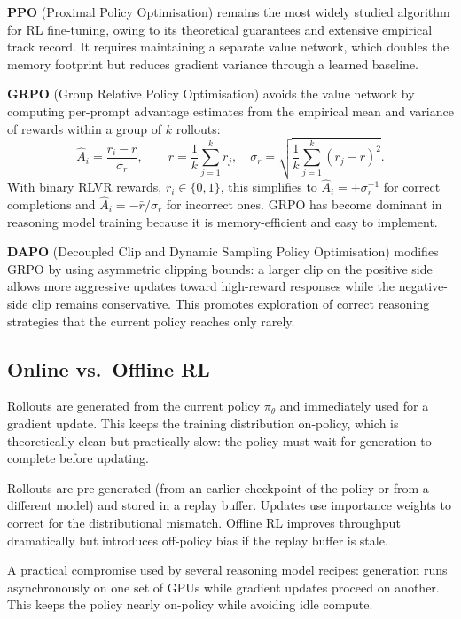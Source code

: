 \textbf{PPO} (Proximal Policy Optimisation)
remains the most widely studied algorithm for RL fine-tuning, owing
to its theoretical guarantees and extensive empirical track record.
It requires maintaining a separate value network, which doubles the
memory footprint but reduces gradient variance through a learned baseline.

\textbf{GRPO} (Group Relative Policy Optimisation) avoids
the value network by computing per-prompt advantage estimates from
the empirical mean and variance of rewards within a group of $k$
rollouts:
\begin{equation}
\label{eq:grpo-advantage-ch15}
\hat{A}_i = \frac{r_i - \bar{r}}{\sigma_r}, \qquad
\bar{r} = \frac{1}{k}\sum_{j=1}^k r_j, \quad
\sigma_r = \sqrt{\frac{1}{k}\sum_{j=1}^k (r_j - \bar{r})^2}.
\end{equation}
With binary RLVR rewards, $r_i \in \{0, 1\}$, this simplifies to
$\hat{A}_i = +\sigma_r^{-1}$ for correct completions and
$\hat{A}_i = -\bar{r}/\sigma_r$ for incorrect ones. GRPO has become
dominant in reasoning model training because it is memory-efficient
and easy to implement.

\textbf{DAPO} (Decoupled Clip and Dynamic Sampling Policy
Optimisation) modifies GRPO by using asymmetric clipping bounds: a
larger clip on the positive side allows more aggressive updates toward
high-reward responses while the negative-side clip remains conservative.
This promotes exploration of correct reasoning strategies that the
current policy reaches only rarely.

\subsection{Online vs.\ Offline RL}
\label{subsec:online-offline}

\begin{description}[leftmargin=!,labelwidth=3.5cm]
\item[Online RL] Rollouts are generated from the current policy
  $\pi_\theta$ and immediately used for a gradient update. This keeps
  the training distribution on-policy, which is theoretically clean
  but practically slow: the policy must wait for generation to complete
  before updating.

\item[Offline RL] Rollouts are pre-generated (from an earlier
  checkpoint of the policy or from a different model) and stored in a
  replay buffer. Updates use importance weights to correct for the
  distributional mismatch. Offline RL improves throughput dramatically
  but introduces off-policy bias if the replay buffer is stale.

\item[Asynchronous RL] A practical compromise used by several
  reasoning model recipes: generation runs asynchronously on one set
  of GPUs while gradient updates proceed on another. This keeps the
  policy nearly on-policy while avoiding idle compute.
\end{description}

